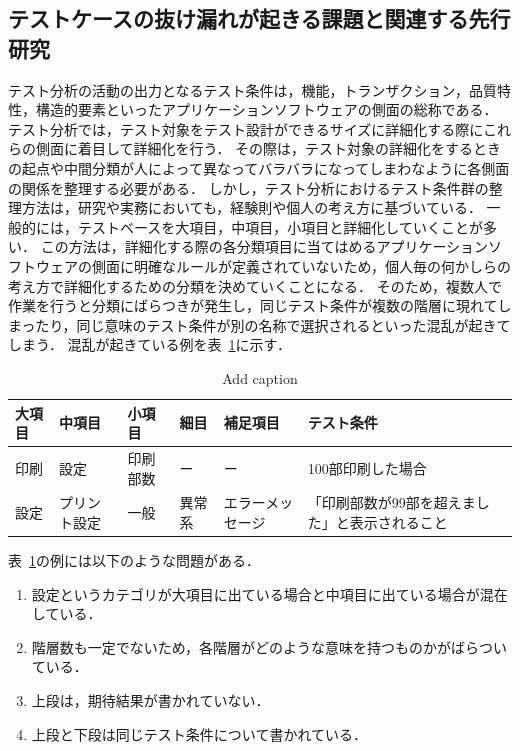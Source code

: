 \documentclass[a4paper,11pt]{jreport}
\begin{document}
\subsection{テストケースの抜け漏れが起きる課題と関連する先行研究}
テスト分析の活動の出力となるテスト条件は，機能，トランザクション，品質特性，構造的要素といったアプリケーションソフトウェアの側面の総称である．
テスト分析では，テスト対象をテスト設計ができるサイズに詳細化する際にこれらの側面に着目して詳細化を行う．
その際は，テスト対象の詳細化をするときの起点や中間分類が人によって異なってバラバラになってしまわなように各側面の関係を整理する必要がある．
しかし，テスト分析におけるテスト条件群の整理方法は，研究や実務においても，経験則や個人の考え方に基づいている．
一般的には，テストベースを大項目，中項目，小項目と詳細化していくことが多い．
この方法は，詳細化する際の各分類項目に当てはめるアプリケーションソフトウェアの側面に明確なルールが定義されていないため，個人毎の何かしらの考え方で詳細化するための分類を決めていくことになる．
そのため，複数人で作業を行うと分類にばらつきが発生し，同じテスト条件が複数の階層に現れてしまったり，同じ意味のテスト条件が別の名称で選択されるといった混乱が起きてしまう．
混乱が起きている例を表~\ref{tab:analysissample}に示す．
\begin{table}[htbp]
  \centering
  \caption{Add caption}
    \begin{tabular}{|l|l|l|l|l|p{9.335em}|}
    \hline
    大項目   & 中項目   & 小項目   & 細目    & 補足項目  & テスト条件 \bigstrut\\
    \hline
    印刷    & 設定    & 印刷部数  & ー     & ー     & 100部印刷した場合 \bigstrut\\
    \hline
    設定    & プリント設定 & 一般    & 異常系   & エラーメッセージ & 「印刷部数が99部を超えました」と表示されること \bigstrut\\
    \hline
    \end{tabular}%
  \label{tab:analysissample}%
\end{table}%
表~\ref{tab:analysissample}の例には以下のような問題がある．
\begin{enumerate}
\item 設定というカテゴリが大項目に出ている場合と中項目に出ている場合が混在している．
\item 階層数も一定でないため，各階層がどのような意味を持つものかがばらついている．
\item 上段は，期待結果が書かれていない．
\item 上段と下段は同じテスト条件について書かれている．
\end{enumerate}
\end{document}
